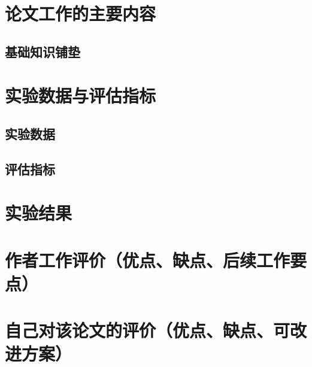 \documentclass[12pt,a4paper]{article}
\begin{document}
	\section{论文工作的主要内容}

	\subsection{基础知识铺垫}

	\section{实验数据与评估指标}
	\subsection{实验数据}
	\noindent
	\subsection{评估指标}
	\noindent

	\section{实验结果}

	\section{作者工作评价（优点、缺点、后续工作要点）}

	\section{自己对该论文的评价（优点、缺点、可改进方案）}
\end{document}
